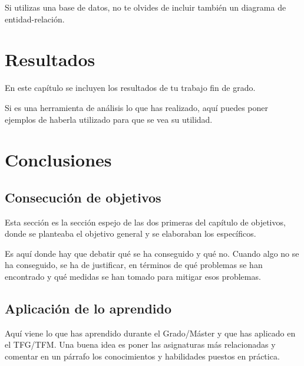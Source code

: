 \documentclass[a4paper, 12pt, english]{book}
\begin{document}
Si utilizas una base de datos, no te olvides de incluir también un diagrama de entidad-relación.



\cleardoublepage
\chapter{Resultados}

En este capítulo se incluyen los resultados de tu trabajo fin de grado.

Si es una herramienta de análisis lo que has realizado, aquí puedes poner ejemplos de haberla utilizado para que se vea su utilidad.



\cleardoublepage
\chapter{Conclusiones}
\label{chap:conclusiones}


\section{Consecución de objetivos}
\label{sec:consecucion-objetivos}

Esta sección es la sección espejo de las dos primeras del capítulo de objetivos, donde se planteaba el objetivo general y se elaboraban los específicos.

Es aquí donde hay que debatir qué se ha conseguido y qué no.
Cuando algo no se ha conseguido, se ha de justificar, en términos de qué problemas se han encontrado y qué medidas se han tomado para mitigar esos problemas.


\section{Aplicación de lo aprendido}
\label{sec:aplicacion}

Aquí viene lo que has aprendido durante el Grado/Máster y que has aplicado en el TFG/TFM. Una buena idea es poner las asignaturas más relacionadas y comentar en un párrafo los conocimientos y habilidades puestos en práctica.
\end{document}
